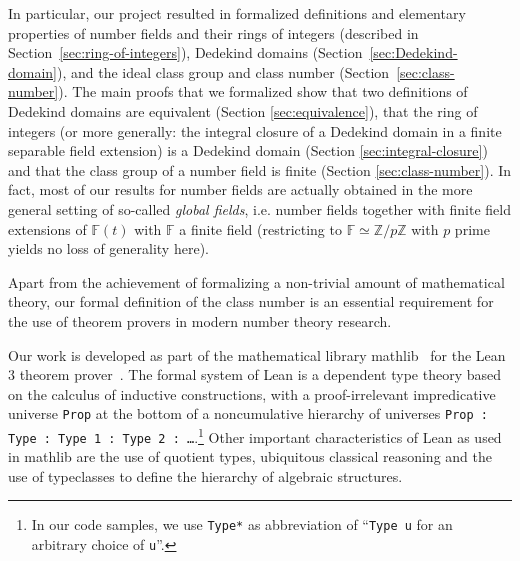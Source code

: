 \documentclass[a4paper,USenglish,cleveref, autoref, thm-restate]{lipics-v2021}
\newcommand{\lean}[1]{\texttt{#1}\xspace} %
\newcommand{\mathlib}{\textsf{mathlib}\xspace}
\newcommand{\Z}{\mathbb{Z}}
\begin{document}
In particular, our project resulted in formalized definitions and elementary properties of
number fields and their rings of integers (described in Section~\ref{sec:ring-of-integers}),
Dedekind domains (Section~\ref{sec:Dedekind-domain}),
and the ideal class group and class number (Section~\ref{sec:class-number}).
The main proofs that we formalized show
that two definitions of Dedekind domains are equivalent (Section \ref{sec:equivalence}),
that the ring of integers (or more generally: the integral closure of a Dedekind domain in a finite separable field extension) is a Dedekind domain (Section \ref{sec:integral-closure})
and that the class group of a number field is finite (Section \ref{sec:class-number}).
In fact, most of our results for number fields are actually obtained in the more general setting of so-called \emph{global fields},
i.e. number fields together with finite field extensions of $\mathbb{F}(t)$ with $\mathbb{F}$ a finite field (restricting to $\mathbb{F} \simeq \Z/p\Z$ with $p$ prime yields no loss of generality here).

%
%
%

Apart from the achievement of formalizing a non-trivial amount of mathematical theory,
our formal definition of the class number is an essential requirement
for the use of theorem provers in modern number theory research.

Our work is developed as part of the mathematical library \mathlib~\cite{mathlib} for the Lean 3 theorem prover~\cite{lean-prover}.
The formal system of Lean is a dependent type theory based on the calculus of inductive constructions,
with a proof-irrelevant impredicative universe \lean{Prop} at the bottom of a noncumulative hierarchy of universes \lean{Prop : Type : Type 1 : Type 2 : \dots}.\footnote{In our code samples, we use \lean{Type*} as abbreviation of ``\lean{Type u} for an arbitrary choice of \lean{u}''.}
Other important characteristics of Lean as used in \mathlib are the use of quotient types, ubiquitous classical reasoning and the use of typeclasses to define the hierarchy of algebraic structures.
\end{document}
